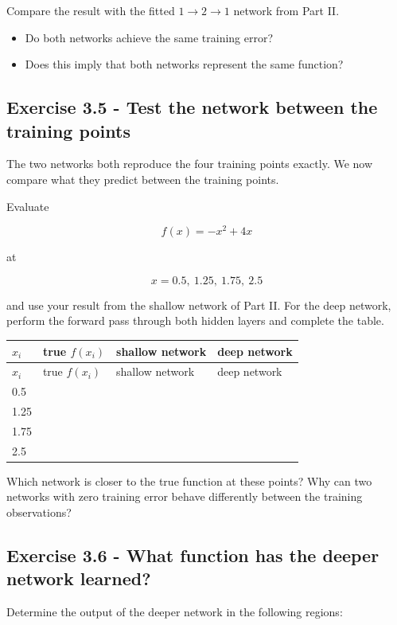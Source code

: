 \documentclass{course_sheet}
\begin{document}
Compare the result with the fitted $1\rightarrow2\rightarrow1$ network from Part II.

\begin{itemize}
\item
Do both networks achieve the same training error?

\item
Does this imply that both networks represent the same function?

\end{itemize}
\subsection*{Exercise 3.5 - Test the network between the training points}
The two networks both reproduce the four training points exactly. We now compare what they predict between the training points.

Evaluate

\[
f(x)=-x^2+4x
\]

at

\[
x=0.5,\ 1.25,\ 1.75,\ 2.5
\]

and use your result from the shallow network of Part II. For the deep network, perform the forward pass through both hidden layers and complete the table.

\begingroup
\small
\setlength{\tabcolsep}{4pt}
\begin{longtable}{l|l|l|l}
$x_i$ & true $f(x_i)$ & shallow network & deep network \\[1.5pt]
\hline
\endfirsthead
$x_i$ & true $f(x_i)$ & shallow network & deep network \\[1.5pt]
\hline
\endhead
\rule{0pt}{2.4ex}0.5 &  $\phantom{-0.00}$ &  $\phantom{-0.00}$ &  $\phantom{-0.00}$ \\[3pt]
\rule{0pt}{2.4ex}1.25 &  $\phantom{-0.00}$ &  $\phantom{-0.00}$ &  $\phantom{-0.00}$ \\[3pt]
\rule{0pt}{2.4ex}1.75 &  $\phantom{-0.00}$ &  $\phantom{-0.00}$ &  $\phantom{-0.00}$ \\[3pt]
\rule{0pt}{2.4ex}2.5 &  $\phantom{-0.00}$ &  $\phantom{-0.00}$ &  $\phantom{-0.00}$ \\[3pt]
\end{longtable}
\endgroup
Which network is closer to the true function at these points? Why can two networks with zero training error behave differently between the training observations?

\subsection*{Exercise 3.6 - What function has the deeper network learned?}
Determine the output of the deeper network in the following regions:
\end{document}
